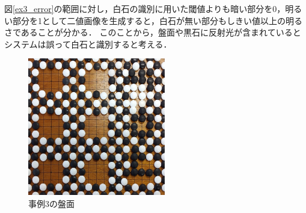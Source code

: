 \documentclass[openright]{nitocs}
\numberwithin{equation}{section}
\begin{document}
                図\ref{ex3_error}の範囲に対し，白石の識別に用いた閾値よりも暗い部分を0，明るい部分を1として二値画像を生成すると，白石が無い部分もしきい値以上の明るさであることが分かる．
                このことから，盤面や黒石に反射光が含まれているとシステムは誤って白石と識別すると考える．
                \begin{figure}[tb] %
                    \begin{center}
                    \includegraphics[clip,width=60mm]{DSC_0098/boardImg.jpg} 
                    \caption{事例3の盤面}
                    \label{ex3_img}
                    \end{center}
                \end{figure}
\end{document}

